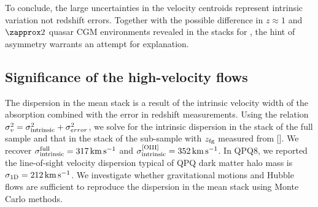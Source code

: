 \documentclass[iop]{emulateapj}
\begin{document}
To conclude, the large uncertainties in the velocity centroids represent intrinsic variation not 
redshift errors. Together with the possible difference in $z\approx1$ and $\zapprox2$ quasar 
CGM environments revealed in the stacks for , the hint of asymmetry warrants an attempt 
for explanation. 


\subsection{Significance of the high-velocity flows}
\label{sec:significance_width}

The dispersion in the  mean stack is a result of the intrinsic velocity width of the 
absorption combined with the error in redshift measurements. Using the relation 
$\sigma_v^2 = \sigma_{\rm intrinsic}^2 + \sigma_{error}^2$, we solve for the intrinsic dispersion 
in the stack of the full sample and that in the stack of the sub-sample with $z_{\rm fg}$ measured 
from []. We recover $\sigma_{\rm intrinsic}^{\rm full}=317\,{\rm km\,s^{-1}}$ and 
$\sigma_{\rm intrinsic}^{\rm [OIII]}=352\,{\rm km\,s^{-1}}$. In QPQ8, we reported the 
line-of-sight velocity dispersion typical of QPQ dark matter halo mass is 
$\sigma_{\rm 1D}=212\,{\rm km\,s^{-1}}$. We investigate whether gravitational motions and Hubble 
flows are sufficient to reproduce the dispersion in the  mean stack using Monte Carlo 
methods. 
\end{document}
